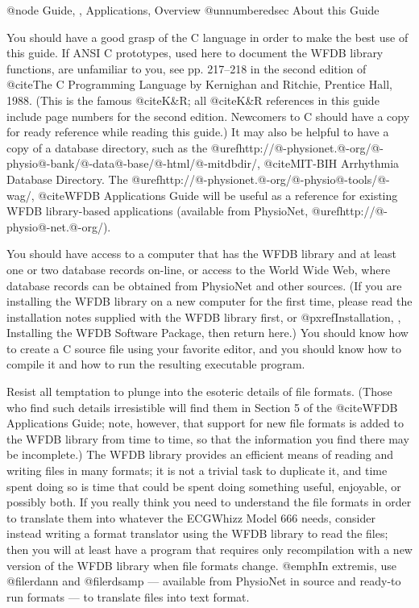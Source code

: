 @node     Guide, , Applications, Overview
@unnumberedsec About this Guide

You should have a good grasp of the C language in order to make the best
use of this guide.  If ANSI C prototypes, used here to document the WFDB
library functions, are unfamiliar to you, see pp. 217--218 in the second
edition of @cite{The C Programming Language} by Kernighan and Ritchie,
Prentice Hall, 1988.  (This is the famous @cite{K&R}; all @cite{K&R}
references in this guide include page numbers for the second edition.
Newcomers to C should have a copy for ready reference while reading this
guide.)  It may also be helpful to have a copy of a database directory,
such as the
@uref{http://@-physionet.@-org/@-physio@-bank/@-data@-base/@-html/@-mitdbdir/,
@cite{MIT-BIH Arrhythmia Database Directory}}.  The 
@uref{http://@-physionet.@-org/@-physio@-tools/@-wag/,
@cite{WFDB Applications Guide}} will be
useful as a reference for existing WFDB library-based applications
(available from PhysioNet, @uref{http://@-physio@-net.@-org/}).

You should have access to a computer that has the WFDB library and at
least one or two database records on-line, or access to the World Wide Web,
where database records can be obtained from PhysioNet and other sources.  (If
you are installing the WFDB library on a new computer for the first time,
please read the installation notes supplied with the WFDB library first, or
@pxref{Installation, , Installing the WFDB Software Package}, then return
here.)  You should know how to create a C source file using your
favorite editor, and you should know how to compile it and how to run
the resulting executable program.

Resist all temptation to plunge into the esoteric details of file
formats.  (Those who find such details irresistible will find them in
Section 5 of the @cite{WFDB Applications Guide}; note, however, that
support for new file formats is added to the WFDB library from time to
time, so that the information you find there may be incomplete.)  The
WFDB library provides an efficient means of reading and writing files in
many formats; it is not a trivial task to duplicate it, and time spent
doing so is time that could be spent doing something useful, enjoyable,
or possibly both.  If you really think you need to understand the file
formats in order to translate them into whatever the ECGWhizz Model 666
needs, consider instead writing a format translator using the WFDB
library to read the files; then you will at least have a program that
requires only recompilation with a new version of the WFDB library when
file formats change.  @emph{In extremis}, use @file{rdann} and
@file{rdsamp} --- available from PhysioNet in source and ready-to run
formats --- to translate files into text format.

